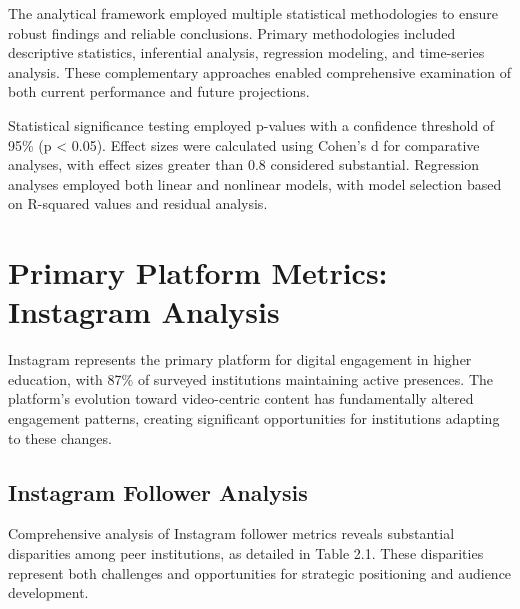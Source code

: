 \documentclass[12pt]{report}
\begin{document}
The analytical framework employed multiple statistical methodologies to ensure robust findings and reliable conclusions. Primary methodologies included descriptive statistics, inferential analysis, regression modeling, and time-series analysis. These complementary approaches enabled comprehensive examination of both current performance and future projections.

Statistical significance testing employed p-values with a confidence threshold of 95\% (p < 0.05). Effect sizes were calculated using Cohen's d for comparative analyses, with effect sizes greater than 0.8 considered substantial. Regression analyses employed both linear and nonlinear models, with model selection based on R-squared values and residual analysis.

\chapter{Primary Platform Metrics: Instagram Analysis}

Instagram represents the primary platform for digital engagement in higher education, with 87\% of surveyed institutions maintaining active presences. The platform's evolution toward video-centric content has fundamentally altered engagement patterns, creating significant opportunities for institutions adapting to these changes.

\section{Instagram Follower Analysis}

Comprehensive analysis of Instagram follower metrics reveals substantial disparities among peer institutions, as detailed in Table 2.1. These disparities represent both challenges and opportunities for strategic positioning and audience development.
\end{document}
